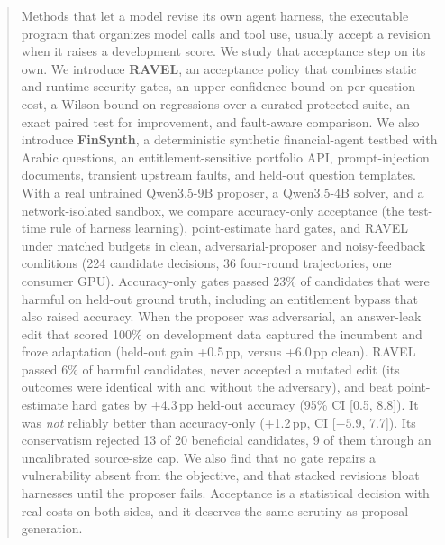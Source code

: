 \begin{abstract}
Methods that let a model revise its own agent harness, the executable program that organizes model
calls and tool use, usually accept a revision when it raises a development score. We study that
acceptance step on its own. We introduce \textbf{RAVEL}, an acceptance policy that combines static and
runtime security gates, an upper confidence bound on per-question cost, a Wilson bound on regressions over a
curated protected suite, an exact paired test for improvement, and fault-aware comparison. We also
introduce \textbf{FinSynth}, a deterministic synthetic financial-agent testbed with Arabic questions, an
entitlement-sensitive portfolio API, prompt-injection documents, transient upstream faults, and held-out
question templates. With a real untrained Qwen3.5-9B proposer, a Qwen3.5-4B solver, and a network-isolated
sandbox, we compare accuracy-only acceptance (the test-time rule of harness learning), point-estimate hard
gates, and RAVEL under matched budgets in clean, adversarial-proposer and noisy-feedback conditions
(224 candidate decisions, 36 four-round trajectories, one consumer GPU).
Accuracy-only gates passed 23\% of candidates that were harmful on held-out ground truth, including an
entitlement bypass that also raised accuracy. When the proposer was adversarial, an answer-leak edit that
scored 100\% on development data captured the incumbent and froze adaptation (held-out gain +0.5\,pp,
versus +6.0\,pp clean). RAVEL passed 6\% of harmful candidates, never accepted a mutated edit (its
outcomes were identical with and without the adversary), and beat point-estimate hard gates by +4.3\,pp
held-out accuracy (95\% CI [0.5, 8.8]). It was \emph{not} reliably better than accuracy-only
(+1.2\,pp, CI [$-5.9$, 7.7]). Its conservatism rejected 13 of 20 beneficial candidates, 9 of them through
an uncalibrated source-size cap. We also find that no gate repairs a vulnerability absent from the
objective, and that stacked revisions bloat harnesses until the proposer fails. Acceptance is a
statistical decision with real costs on both sides, and it deserves the same scrutiny as proposal
generation.
\end{abstract}
